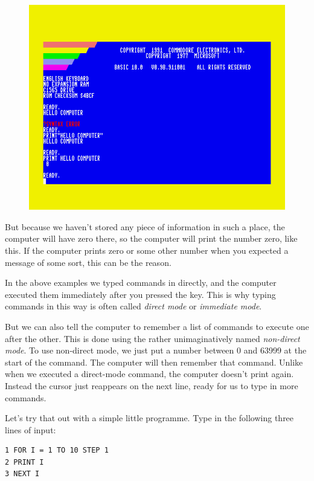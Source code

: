   \begin{figure}
    \includegraphics[width=\linewidth]{images/print-hello-computer-no-quotes.png}
  \end{figure}  

  But because we haven't stored any piece of information in such a place,
  the computer will have zero there, so the computer will print the number
  zero, like this. If the computer prints zero or some other number when
  you expected a message of some sort, this can be the reason.

  In the above examples we typed commands in directly, and the computer executed
  them immediately after you pressed the  key.  This is why
  typing commands in this way is often called {\em direct mode} or {\em immediate mode}.
  
  But we can also tell the computer to remember a list of commands to execute one
  after the other.   This is done using the rather unimaginatively named {\em non-direct mode}.
  To use non-direct mode, we just put a number between 0 and 63999 at the start of
  the command.  The computer will then remember that command.  Unlike when we executed
  a direct-mode command, the computer doesn't print  again. Instead the cursor
  just reappears on the next line, ready for us to type in more commands.

  Let's try that out with a simple little programme.  Type in the following three lines of
  input:

\begin{tcolorbox}[colback=black,coltext=white]
\verbatimfont{\codefont}
\begin{verbatim}
1 FOR I = 1 TO 10 STEP 1
2 PRINT I
3 NEXT I
\end{verbatim}
\end{tcolorbox}

